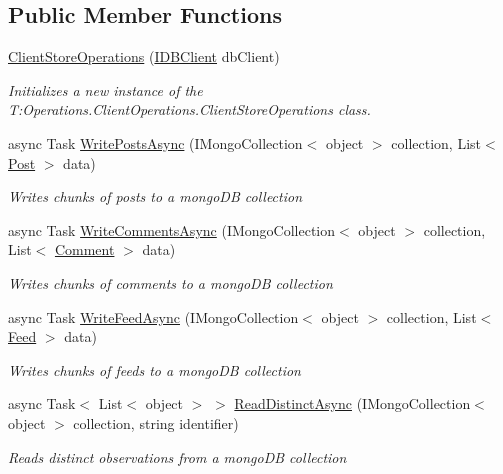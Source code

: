 \subsection*{Public Member Functions}
\begin{DoxyCompactItemize}
\item 
\hyperlink{class_operations_1_1_client_operations_1_1_client_store_operations_aac158f2176257f4bc25f7cadbd691314}{Client\+Store\+Operations} (\hyperlink{interface_client_1_1_i_d_b_client}{I\+D\+B\+Client} db\+Client)
\begin{DoxyCompactList}\small\item\em Initializes a new instance of the T\+:\+Operations.\+Client\+Operations.\+Client\+Store\+Operations class. \end{DoxyCompactList}\item 
async Task \hyperlink{class_operations_1_1_client_operations_1_1_client_store_operations_aee5d81f7d7dc12cffba2f01ec106bb62}{Write\+Posts\+Async} (I\+Mongo\+Collection$<$ object $>$ collection, List$<$ \hyperlink{class_data_1_1_facebook_objects_1_1_post}{Post} $>$ data)
\begin{DoxyCompactList}\small\item\em Writes chunks of posts to a mongo\+DB collection \end{DoxyCompactList}\item 
async Task \hyperlink{class_operations_1_1_client_operations_1_1_client_store_operations_aafbb730be7ef14c4ee434266a3600f04}{Write\+Comments\+Async} (I\+Mongo\+Collection$<$ object $>$ collection, List$<$ \hyperlink{class_data_1_1_facebook_objects_1_1_comment}{Comment} $>$ data)
\begin{DoxyCompactList}\small\item\em Writes chunks of comments to a mongo\+DB collection \end{DoxyCompactList}\item 
async Task \hyperlink{class_operations_1_1_client_operations_1_1_client_store_operations_a4819e9a632eab5db4e21644512205377}{Write\+Feed\+Async} (I\+Mongo\+Collection$<$ object $>$ collection, List$<$ \hyperlink{class_data_1_1_facebook_objects_1_1_feed}{Feed} $>$ data)
\begin{DoxyCompactList}\small\item\em Writes chunks of feeds to a mongo\+DB collection \end{DoxyCompactList}\item 
async Task$<$ List$<$ object $>$ $>$ \hyperlink{class_operations_1_1_client_operations_1_1_client_store_operations_a998a7bdb46661c725cd8ff2af53c1274}{Read\+Distinct\+Async} (I\+Mongo\+Collection$<$ object $>$ collection, string identifier)
\begin{DoxyCompactList}\small\item\em Reads distinct observations from a mongo\+DB collection \end{DoxyCompactList}\end{DoxyCompactItemize}


